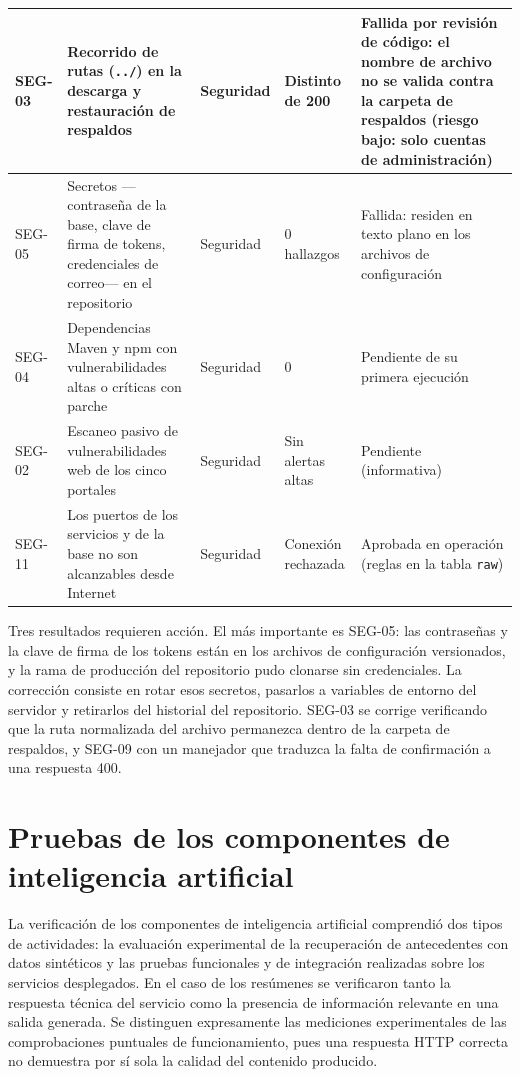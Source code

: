 \begin{longtable}{|p{1.2cm}|L{5.6cm}|L{2.2cm}|L{2.6cm}|L{2.9cm}|}
		SEG-03 & Recorrido de rutas (\texttt{../}) en la descarga y restauración de respaldos & Seguridad &
		Distinto de 200 & Fallida por revisión de código: el nombre de archivo no se valida contra la carpeta
		de respaldos (riesgo bajo: solo cuentas de administración) \\ \hline
		SEG-05 & Secretos ---contraseña de la base, clave de firma de tokens, credenciales de correo--- en el
		repositorio & Seguridad & 0 hallazgos & Fallida: residen en texto plano en los archivos de
		configuración \\ \hline
		SEG-04 & Dependencias Maven y npm con vulnerabilidades altas o críticas con parche & Seguridad & 0 &
		Pendiente de su primera ejecución \\ \hline
		SEG-02 & Escaneo pasivo de vulnerabilidades web de los cinco portales & Seguridad & Sin alertas
		altas & Pendiente (informativa) \\ \hline
		SEG-11 & Los puertos de los servicios y de la base no son alcanzables desde Internet & Seguridad &
		Conexión rechazada & Aprobada en operación (reglas en la tabla \texttt{raw}) \\ \hline
	\end{longtable}
	\normalsize

	Tres resultados requieren acción. El más importante es SEG-05: las contraseñas y la clave de firma
	de los tokens están en los archivos de configuración versionados, y la rama de producción del
	repositorio pudo clonarse sin credenciales. La corrección consiste en rotar esos secretos, pasarlos a
	variables de entorno del servidor y retirarlos del historial del repositorio. SEG-03 se corrige
	verificando que la ruta normalizada del archivo permanezca dentro de la carpeta de respaldos, y SEG-09
	con un manejador que traduzca la falta de confirmación a una respuesta 400.

	\section{Pruebas de los componentes de inteligencia artificial}
\label{sec:pruebas_ia}

La verificación de los componentes de inteligencia artificial comprendió dos tipos de actividades:
la evaluación experimental de la recuperación de antecedentes con datos sintéticos y las
pruebas funcionales y de integración realizadas sobre los servicios desplegados. En el caso de
los resúmenes se verificaron tanto la respuesta técnica del servicio como la presencia de
información relevante en una salida generada. Se distinguen expresamente las mediciones
experimentales de las comprobaciones puntuales de funcionamiento, pues una respuesta HTTP
correcta no demuestra por sí sola la calidad del contenido producido.

